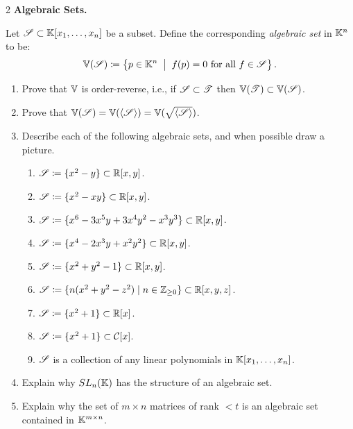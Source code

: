 \documentclass[Notebook.tex]{subfiles}
\begin{document}
\newpage


\begin{problem}{2}
    \textbf{Algebraic Sets.} 
    
    Let $\operatorname{\mathscr S} \subset \mathbb K[x_1,\ldots,x_n]$ be a subset. Define the corresponding \emph{algebraic set} in $\mathbb K^n$ to be:
    \[
    \mathbb V(\operatorname{\mathscr S}) \coloneqq \left\{ p \in \mathbb K^n \;\; \big|\;\; f(p) = 0 \text{ for all $f \in \operatorname{\mathscr S}$}\right\}.
    \]
    \begin{enumerate}[label=(\alph*),ref=\theenumi\alph*]
        \item Prove that $\mathbb V$ is order-reverse, i.e., if $\operatorname{\mathscr S} \subset \operatorname{\mathscr T}$ then $\mathbb V(\operatorname{\mathscr T}) \subset \mathbb V(\operatorname{\mathscr S})$. 
        \item Prove that $\mathbb V(\operatorname{\mathscr S}) = \mathbb V(\langle \operatorname{\mathscr S} \rangle) = \mathbb V(\sqrt{\langle \operatorname{\mathscr S}\rangle})$.
        \item Describe each of the following algebraic sets, and when possible draw a picture. 

        \begin{enumerate}[label=(\roman*), ref=\theenumi\roman*]
            \item $\operatorname{\mathscr S} \coloneqq \{x^2 - y\} \subset \mathbb R[x,y]$.
            \item $\operatorname{\mathscr S} \coloneqq \{x^2 - xy\} \subset \mathbb R[x,y]$.
            \item $\operatorname{\mathscr S} \coloneqq \{x^6 - 3 x^5 y + 3 x^4 y^2 - x^3 y^3\} \subset \mathbb R[x,y]$.
            \item $\operatorname{\mathscr S} \coloneqq \{x^4 -2x^{3}y + x^2y^2\} \subset \mathbb R[x,y]$.
            \item $\operatorname{\mathscr S} \coloneqq \{x^2 + y^2-1\} \subset \mathbb R[x,y]$.
            \item $\operatorname{\mathscr S} \coloneqq \{n(x^2+y^2-z^2) \; | \; n \in \mathbb Z_{\geq0} \} \subset \mathbb R[x,y,z]$.
            \item $\operatorname{\mathscr S} \coloneqq \{x^2 + 1 \} \subset \mathbb R[x]$.
            \item $\operatorname{\mathscr S} \coloneqq \{x^2 + 1\} \subset \mathcal{C}[x]$.
            \item $\operatorname{\mathscr S}$ is a collection of any linear polynomials in $\mathbb K[x_1,\ldots,x_n]$.
        \end{enumerate}
        \item Explain why $SL_{n}(\mathbb K)$ has the structure of an algebraic set. 
        \item Explain why the set of $m \times n$ matrices of rank $<t$ is an algebraic set contained in $\mathbb K^{m \times n}$. 
    \end{enumerate}
\end{problem}
\end{document}
